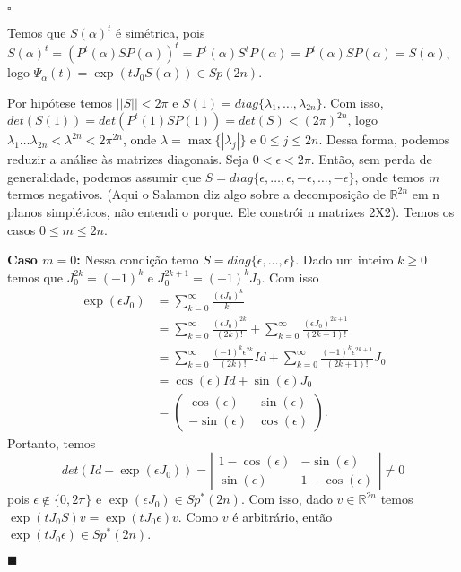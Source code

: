 \documentclass[12pt]{book}
\newenvironment{prova}[1]{$\square$ #1}{\hfill$\blacksquare$}
\newcommand{\estruturacomplexa}{J_{0}}
\newcommand{\gruposimpletico}[1]{Sp(#1)}
\newcommand{\gruposimpleticonaodegenerado}[1]{Sp^{#1}(2n)}
\newcommand{\norma}[1]{||#1||}
\newcommand{\real}[1]{\mathbb{R}^{#1}}
\newcommand{\vermelho}[1]{{\color{red}#1}}
\begin{document}
\begin{prova}
\begin{enumerate}
			Temos que $S(\alpha)^{t}$ é simétrica, pois $S(\alpha)^{t} = (P^{t}(\alpha)SP(\alpha))^{t} = P^{t}(\alpha)S^{t}P(\alpha) = P^{t}(\alpha)SP(\alpha) = S(\alpha)$, logo $\Psi_{\alpha}(t)=\exp(t\estruturacomplexa S(\alpha)) \in \gruposimpletico{2n}$.
			
			Por hipótese temos $\norma{S}< 2\pi $ e $S(1) = diag\{\lambda_{1}, \dots, \lambda_{2n}\}$. Com isso, $det(S(1)) = det(P^{t}(1)SP(1)) = det(S)< (2\pi)^{2n}$, logo $\lambda_{1} \dots \lambda_{2n}< \lambda^{2n} < 2\pi^{2n}$, onde $\lambda = \max\{|\lambda_{j}|\}$ e $0\leq j\leq 2n$. Dessa forma, podemos reduzir a análise às matrizes diagonais. Seja $0<\epsilon<2\pi$. Então, sem perda de generalidade, podemos assumir que $S = diag\{\epsilon, \dots, \epsilon, -\epsilon, \dots, -\epsilon \}$, onde temos $m$ termos negativos. \vermelho{(Aqui o Salamon diz algo sobre a decomposição de $\real{2n}$ em n planos simpléticos, não entendi o porque. Ele constrói n matrizes 2X2).} Temos os casos $0\leq m\leq 2n$.
			
			\textbf{Caso $m = 0$:} Nessa condição temo $S = diag\{\epsilon, \dots, \epsilon\}$. Dado um inteiro $k\geq 0$ temos que $\estruturacomplexa^{2k} = (-1)^{k}$ e $\estruturacomplexa^{2k+1} = (-1)^{k}\estruturacomplexa$. Com isso
			$$
			\begin{aligned}
			\exp(\epsilon\estruturacomplexa ) 
			&= \sum_{k=0}^{\infty}\frac{(\epsilon\estruturacomplexa)^{k}}{k!} 
			\\
			&= \sum_{k=0}^{\infty}\frac{(\epsilon\estruturacomplexa)^{2k}}{(2k)!} + \sum_{k=0}^{\infty}\frac{(\epsilon\estruturacomplexa)^{2k+1}}{(2k+1)!}
			\\
			&=\sum_{k=0}^{\infty}\frac{(-1)^{k} \epsilon^{2k} }{(2k)!} Id+ \sum_{k=0}^{\infty}\frac{(-1)^{k} \epsilon^{2k+1}}{(2k+1)!}\estruturacomplexa
			\\
			&=\cos(\epsilon)Id+\sin(\epsilon)\estruturacomplexa
			\\
			&=
			\left(
			\begin{array}{cc}
			\cos(\epsilon) & \sin(\epsilon)
			\\
			-\sin(\epsilon) & \cos(\epsilon)
			\end{array}
			\right).
			\
			\end{aligned}
			$$
			Portanto, temos
			$$
			det(Id - \exp(\epsilon\estruturacomplexa ) )=
			\left|
			\begin{array}{cc}
			1-\cos(\epsilon) & -\sin(\epsilon)
			\\
			\sin(\epsilon) & 1-\cos(\epsilon)
			\end{array}
			\right| \neq 0
			$$
			pois $\epsilon \notin \{0, 2\pi\}$ e $\exp(\epsilon\estruturacomplexa ) \in \gruposimpleticonaodegenerado{*}$. Com isso, dado $v \in \real{2n}$ temos $\exp(t\estruturacomplexa S)v = \exp(t\estruturacomplexa \epsilon)v$. Como $v$ é arbitrário, então $ \exp(t\estruturacomplexa \epsilon) \in \gruposimpleticonaodegenerado{*}$. 
			

\end{enumerate}
\end{prova}
\end{document}
